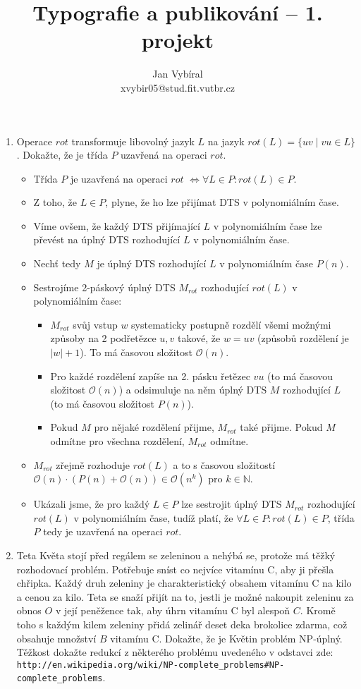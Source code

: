 \documentclass[a4paper,11pt]{article}[24.3.2010]
\author{Jan Vybíral\\xvybir05@stud.fit.vutbr.cz}
\title{Typografie a publikování -- 1. projekt}
\date{}
\begin{document}
\begin{enumerate}
\item Operace $rot$ transformuje libovolný jazyk $L$ na jazyk $rot(L)=\{uv \mid vu \in L\}$. Dokažte, že je třída $P$ uzavřená na operaci $rot$.
\begin{itemize}
\item Třída $P$ je uzavřená na operaci $rot$ $\Leftrightarrow \forall L \in P : rot(L) \in P$. 
\item Z toho, že $L \in P$, plyne, že ho lze přijímat DTS v polynomiálním čase.
\item Víme ovšem, že každý DTS přijímající $L$ v polynomiálním čase lze převést na úplný DTS rozhodující $L$ v polynomiálním čase.
\item Nechť tedy $M$ je úplný DTS rozhodující $L$ v polynomiálním čase $P(n)$.
\item Sestrojíme 2-páskový úplný DTS $M_{rot}$ rozhodující $rot(L)$ v polynomiálním čase:
\begin{itemize}
\item $M_{rot}$ svůj vstup  $w$ systematicky postupně rozdělí všemi možnými způsoby na 2 podřetězce $u,v$ takové, že $w=uv$ (způsobů rozdělení je $|w|+1$). To má časovou složitost $\mathcal{O}(n)$.
\item Pro každé rozdělení zapíše na 2. pásku řetězec $vu$ (to má časovou složitost $\mathcal{O}(n)$) a odsimuluje na něm úplný DTS $M$ rozhodující $L$ (to má časovou složitost $P(n)$). 
\item Pokud $M$ pro nějaké rozdělení přijme, $M_{rot}$ také přijme. Pokud $M$ odmítne pro všechna rozdělení, $M_{rot}$ odmítne.
\end{itemize}
\item $M_{rot}$ zřejmě rozhoduje $rot(L)$ a to s časovou složitostí $\mathcal{O}(n) \cdot (P(n) + \mathcal{O}(n)) \in \mathcal{O}(n^k)$ pro $k \in \mathbb{N}$.
\item Ukázali jsme, že pro každý $L \in P$ lze sestrojit úplný DTS $M_{rot}$ rozhodující $rot(L)$ v polynomiálním čase, tudíž platí, že $\forall L \in P : rot(L) \in P$, třída $P$ tedy je uzavřená na operaci $rot$.
\end{itemize}
\newpage
\item Teta Květa stojí před regálem se zeleninou a nehýbá se, protože má těžký rozhodovací problém. Potřebuje sníst co nejvíce vitamínu C, aby ji přešla chřipka. Každý druh zeleniny je charakteristický obsahem vitamínu C na kilo a cenou za kilo. Teta se snaží přijít na to, jestli je možné nakoupit zeleninu za obnos $O$ v její peněžence tak, aby úhrn vitamínu C byl alespoň $C$. Kromě toho s každým kilem zeleniny přidá zelinář deset deka brokolice zdarma, což obsahuje množství $B$ vitamínu C. Dokažte, že je Květin problém NP-úplný. Těžkost dokažte redukcí z některého problému uvedeného v odstavci  zde:\\ \texttt{http://en.wikipedia.org/wiki/NP-complete\_problems\#NP-complete\_problems}. \\


\end{enumerate}
\end{document}
